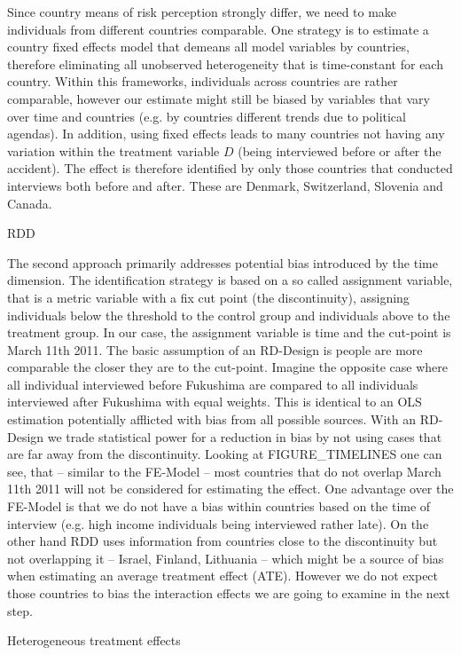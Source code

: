 {Since country means of risk perception strongly differ, we need to make individuals from different countries comparable. One strategy is to estimate a country fixed effects model that demeans all model variables by countries, therefore eliminating all unobserved heterogeneity that is time-constant for each country. Within this frameworks, individuals across countries are rather comparable, however our estimate might still be biased by variables that vary over time and countries (e.g. by countries different trends due to political agendas). In addition, using fixed effects leads to many countries not having any variation within the treatment variable $D$ (being interviewed before or after the accident). The effect is therefore identified by only those countries that conducted interviews both before and after. These are Denmark, Switzerland, Slovenia and Canada. 

RDD

The second approach primarily addresses potential bias introduced by the time dimension. The identification strategy is based on a so called assignment variable, that is a metric variable with a fix cut point (the discontinuity), assigning individuals below the threshold to the control group and individuals above to the treatment group. In our case, the assignment variable is time and the cut-point is March 11th 2011. The basic assumption of an RD-Design is people are more comparable the closer they are to the cut-point. Imagine the opposite case where all individual interviewed before Fukushima are compared to all individuals interviewed after Fukushima with equal weights. This is identical to an OLS estimation potentially afflicted with bias from all possible sources. With an RD-Design we trade statistical power for a reduction in bias by not using cases that are far away from the discontinuity. Looking at FIGURE_TIMELINES one can see, that -- similar to the FE-Model -- most countries that do not overlap March 11th 2011 will not be considered for estimating the effect. One advantage over the FE-Model is that we do not have a bias within countries based on the time of interview (e.g. high income individuals being interviewed rather late). On the other hand RDD uses information from countries close to the discontinuity but not overlapping it -- Israel, Finland, Lithuania -- which might be a source of bias when estimating an average treatment effect (ATE). However we do not expect those countries to bias the interaction effects we are going to examine in the next step.

Heterogeneous treatment effects

}

